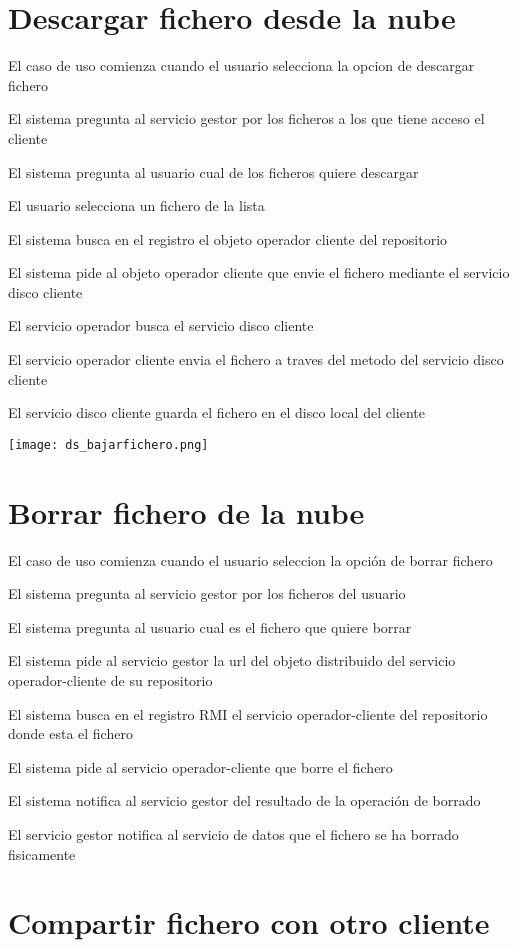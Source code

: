 \section{Descargar fichero desde la nube}
\begin{compactenum}
\item El caso de uso comienza cuando el usuario selecciona la opcion de descargar fichero
\item El sistema pregunta al servicio gestor por los ficheros a los que tiene acceso el cliente
\item El sistema pregunta al usuario cual de los ficheros quiere descargar
\item El usuario selecciona un fichero de la lista
\item El sistema busca en el registro el objeto operador cliente del repositorio
\item El sistema pide al objeto operador cliente que envie el fichero mediante el servicio disco cliente
\item El servicio operador busca el servicio disco cliente
\item El servicio operador cliente envia el fichero a traves del metodo del servicio disco cliente
\item El servicio disco cliente guarda el fichero en el disco local del cliente
\end{compactenum}
\texttt{[image: ds\_bajarfichero.png]}

\section{Borrar fichero de la nube}
\begin{compactenum}
\item El caso de uso comienza cuando el usuario seleccion la opción de borrar fichero
\item El sistema pregunta al servicio gestor por los ficheros del usuario
\item El sistema pregunta al usuario cual es el fichero que quiere borrar
\item El sistema pide al servicio gestor la url del objeto distribuido del servicio operador-cliente de su repositorio
\item El sistema busca en el registro RMI el servicio operador-cliente del repositorio donde esta el fichero
\item El sistema pide al servicio operador-cliente que borre el fichero
\item El sistema notifica al servicio gestor del resultado de la operación de borrado
\item El servicio gestor notifica al servicio de datos que el fichero se ha borrado fisicamente
\end{compactenum}


\section{Compartir fichero con otro cliente}
